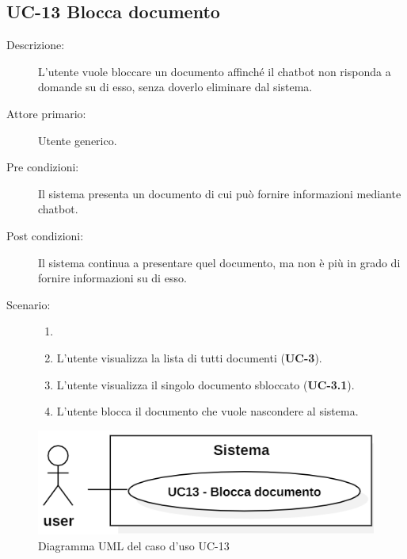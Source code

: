 \subsection{UC-13 Blocca documento}
\begin{description}
    \item[Descrizione:] L'utente vuole bloccare un documento affinché il chatbot non risponda a domande su di esso, senza doverlo eliminare dal sistema.
    \item[Attore primario:] Utente generico.
    \item[Pre condizioni:] Il sistema presenta un documento di cui può fornire informazioni mediante chatbot.
    \item[Post condizioni:] Il sistema continua a presentare quel documento, ma non è più in grado di fornire informazioni su di esso.
    \item[Scenario:]
    \begin{enumerate}
        \item[]
        \item L’utente visualizza la lista di tutti documenti (\textbf{UC-3}).
        \item L'utente visualizza il singolo documento sbloccato (\textbf{UC-3.1}).
        \item L'utente blocca il documento che vuole nascondere al sistema.
    \end{enumerate}
\end{description}

\begin{figure}[H]
    \centering
    \includegraphics[width=0.8\linewidth]{UC13.PNG}
    \caption{Diagramma UML del caso d'uso UC-13}
\end{figure}

